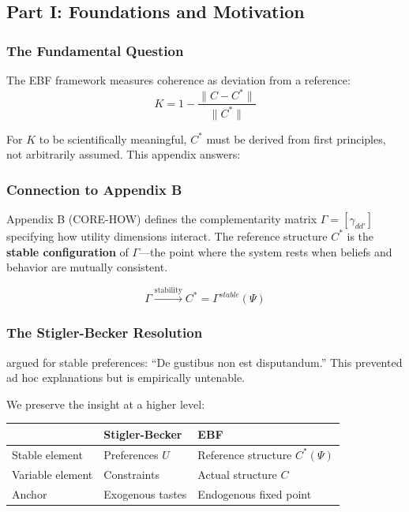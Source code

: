 \subsection{Part I: Foundations and Motivation}
\label{sec:D-foundations}

\subsubsection{The Fundamental Question}

The EBF framework measures coherence as deviation from a reference:
\begin{equation}
K = 1 - \frac{\|C - C^*\|}{\|C^*\|}
\end{equation}

For $K$ to be scientifically meaningful, $C^*$ must be derived from first
principles, not arbitrarily assumed. This appendix answers:

\begin{center}
\end{center}

\subsubsection{Connection to Appendix B}

Appendix B (CORE-HOW) defines the complementarity matrix $\Gamma = [\gamma_{dd'}]$
specifying how utility dimensions interact. The reference structure $C^*$ is
the \textbf{stable configuration} of $\Gamma$---the point where the system rests
when beliefs and behavior are mutually consistent.

\begin{equation}
\Gamma \xrightarrow{\text{stability}} C^* = \Gamma^{stable}(\Psi)
\end{equation}

\subsubsection{The Stigler-Becker Resolution}

\citet{stiglerbecker1977} argued for stable preferences: ``De gustibus non est
disputandum.'' This prevented ad hoc explanations but is empirically untenable.

We preserve the insight at a higher level:

\begin{center}
\renewcommand{\arraystretch}{1.3}
\begin{tabular}{lll}
\hline
& \textbf{Stigler-Becker} & \textbf{EBF} \\
\hline
Stable element & Preferences $U$ & Reference structure $C^*(\Psi)$ \\
Variable element & Constraints & Actual structure $C$ \\
Anchor & Exogenous tastes & Endogenous fixed point \\
\hline
\end{tabular}
\end{center}

